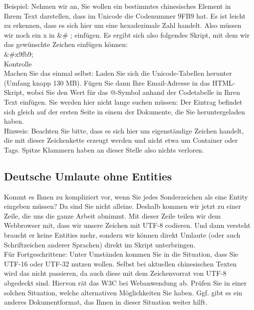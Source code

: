 Beispiel: Nehmen wir an, Sie wollen ein bestimmtes chinesisches Element in Ihrem Text darstellen, dass im Unicode die Codenummer 9FB9 hat. Es ist leicht zu erkennen, dass es sich hier um eine hexadezimale Zahl handelt. Also müssen wir noch ein x in \&\#    ; einfügen. Es ergibt sich also folgendes Skript, mit dem wir das gewünschte Zeichen einfügen können:\\

\&\#x9fb9;\\

Kontrolle\\

Machen Sie das einmal selbst: Laden Sie sich die Unicode-Tabellen herunter (Umfang knapp 130 MB). Fügen Sie dann Ihre Email-Adresse in das HTML-Skript, wobei Sie den Wert für das @-Symbol anhand der Codetabelle in Ihren Text einfügen. Sie werden hier nicht lange suchen müssen: Der Eintrag befindet sich gleich auf der ersten Seite in einem der Dokumente, die Sie heruntergeladen haben.\\

Hinweis: Beachten Sie bitte, dass es sich hier um eigenständige Zeichen handelt, die mit dieser Zeichenkette erzeugt werden und nicht etwa um Container oder Tags. Spitze Klammern haben an dieser Stelle also nichts verloren.

\subsection{Deutsche Umlaute ohne Entities}

Kommt es Ihnen zu kompliziert vor, wenn Sie jedes Sonderzeichen als eine Entity eingeben müssen? Da sind Sie nicht alleine. Deshalb kommen wir jetzt zu einer Zeile, die uns die ganze Arbeit abnimmt. Mit dieser Zeile teilen wir dem Webbrowser mit, dass wir unsere Zeichen mit UTF-8 codieren. Und dann versteht braucht er keine Entities mehr, sondern wir können direkt Umlaute (oder auch Schriftzeichen anderer Sprachen) direkt im Skript unterbringen.\\

Für Fortgeschrittene: Unter Umständen kommen Sie in die Situation, dass Sie UTF-16 oder UTF-32 nutzen wollen. Selbst bei aktuellen chinesischen Texten wird das nicht passieren, da auch diese mit dem Zeichenvorrat von UTF-8 abgedeckt sind. Hiervon rät das W3C bei Webanwendung ab. Prüfen Sie in einer solchen Situation, welche alternativen Möglichkeiten Sie haben. Ggf. gibt es ein anderes Dokumentformat, das Ihnen in dieser Situation weiter hilft.\\

